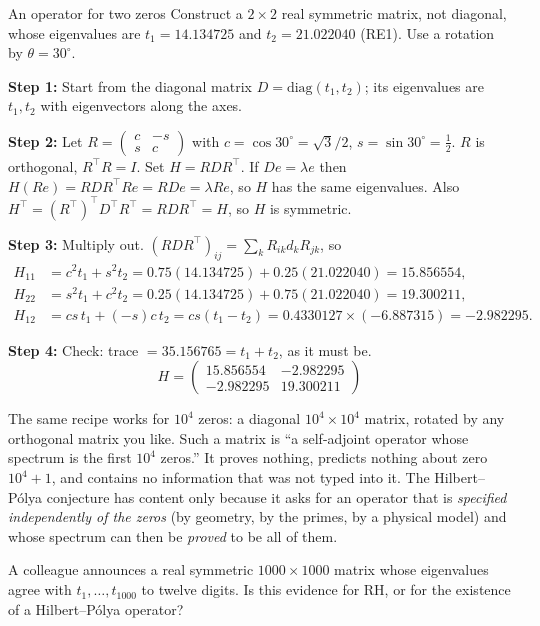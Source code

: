 \begin{sample}{An operator for two zeros}
Construct a $2\times2$ real symmetric matrix, not diagonal, whose eigenvalues are $t_1=14.134725$ and $t_2=21.022040$ (RE1). Use a rotation by $\theta=30^\circ$.

\textbf{Step 1:} Start from the diagonal matrix $D=\mathrm{diag}(t_1,t_2)$; its eigenvalues are $t_1,t_2$ with eigenvectors along the axes.

\textbf{Step 2:} Let $R=\begin{pmatrix}c&-s\\s&c\end{pmatrix}$ with $c=\cos30^\circ=\sqrt3/2$, $s=\sin30^\circ=\tfrac12$. $R$ is orthogonal, $R^\top R=I$. Set $H=RDR^\top$. If $De=\lambda e$ then $H(Re)=RDR^\top Re=RDe=\lambda Re$, so $H$ has the same eigenvalues. Also $H^\top=(R^\top)^\top D^\top R^\top=RDR^\top=H$, so $H$ is symmetric.

\textbf{Step 3:} Multiply out. $(RDR^\top)_{ij}=\sum_k R_{ik}d_kR_{jk}$, so
\begin{align*}
H_{11}&=c^2t_1+s^2t_2=0.75(14.134725)+0.25(21.022040)=15.856554,\\
H_{22}&=s^2t_1+c^2t_2=0.25(14.134725)+0.75(21.022040)=19.300211,\\
H_{12}&=cs\,t_1+(-s)c\,t_2=cs(t_1-t_2)=0.4330127\times(-6.887315)=-2.982295 .
\end{align*}

\textbf{Step 4:} Check: trace $=35.156765=t_1+t_2$, as it must be.
\[
\boxed{H=\begin{pmatrix}15.856554&-2.982295\\-2.982295&19.300211\end{pmatrix}}
\]
\end{sample}

The same recipe works for $10^4$ zeros: a diagonal $10^4\times10^4$ matrix, rotated by any orthogonal matrix you like. Such a matrix is ``a self-adjoint operator whose spectrum is the first $10^4$ zeros.'' It proves nothing, predicts nothing about zero $10^4+1$, and contains no information that was not typed into it. The Hilbert--P\'olya conjecture has content only because it asks for an operator that is \emph{specified independently of the zeros} (by geometry, by the primes, by a physical model) and whose spectrum can then be \emph{proved} to be all of them.

\begin{checkpoint}
A colleague announces a real symmetric $1000\times1000$ matrix whose eigenvalues agree with $t_1,\dots,t_{1000}$ to twelve digits. Is this evidence for RH, or for the existence of a Hilbert--P\'olya operator?
\end{checkpoint}

